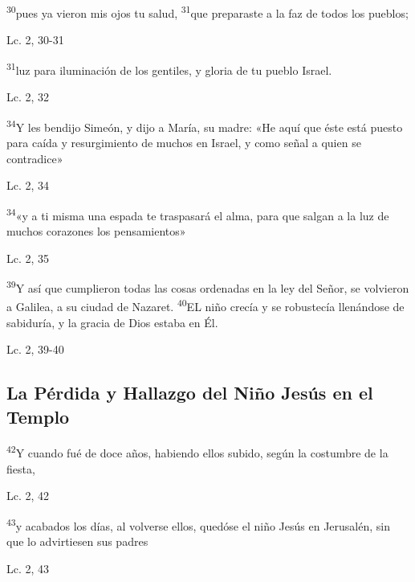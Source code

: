 \documentclass[a4paper,11pt]{article}
\begin{document}
      \textsuperscript{30}pues ya vieron mis ojos tu salud, \textsuperscript{31}que preparaste a la faz de todos los pueblos;
      \begin{flushright}
        Lc. 2, 30-31         
      \end{flushright}
      
      \textsuperscript{31}luz para iluminación de los gentiles, y gloria de tu pueblo Israel.
      \begin{flushright}
        Lc. 2, 32        
      \end{flushright}
      
      \textsuperscript{34}Y les bendijo Simeón, y dijo a María, su madre: «He aquí que éste está puesto para caída y resurgimiento de muchos en Israel, y como
      señal a quien se contradice»
      \begin{flushright}
        Lc. 2, 34       
      \end{flushright}
      
      \textsuperscript{34}«y a ti misma una espada te traspasará el alma, para que salgan a la luz de muchos corazones los pensamientos»
      \begin{flushright}
        Lc. 2, 35         
      \end{flushright} 
      
      \textsuperscript{39}Y así que cumplieron todas las cosas ordenadas en la ley del Señor, se volvieron a Galilea, a su ciudad de Nazaret. \textsuperscript{40}EL niño crecía
      y se robustecía llenándose de sabiduría, y la gracia de Dios estaba en Él.
      \begin{flushright}
        Lc. 2, 39-40         
      \end{flushright}
            
    \subsection*{\hfil La Pérdida y Hallazgo del Niño Jesús en el Templo \hfil}
      
      \textsuperscript{42}Y cuando fué de doce años, habiendo ellos subido, según la costumbre de la fiesta,
      \begin{flushright}
        Lc. 2, 42     
      \end{flushright}
      
      \textsuperscript{43}y acabados los días, al volverse ellos, quedóse el niño Jesús en Jerusalén, sin que lo advirtiesen sus padres
      \begin{flushright}
        Lc. 2, 43        
      \end{flushright}
      
\end{document}
